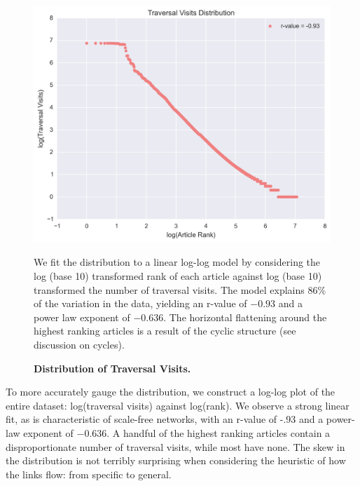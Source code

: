 \documentclass[pre,twocolumn,twoside,superscriptaddress,floatfix, aps, 10pt]{revtex4-1}
\begin{document}
\begin{figure}[tp!]
  \centering	
  \includegraphics[width=\columnwidth]{graphics/traversals_per_article.png} 
  \caption{
    \textbf{Distribution of Traversal Visits.}
  }
  We fit the distribution to a linear log-log model by considering the log (base 10) transformed rank of each article against log (base 10) transformed the number of traversal visits. 
  The model explains $86\%$ of the variation in the data, yielding an r-value of $-0.93$ 
  and a power law exponent of $-0.636$. The horizontal flattening around the highest
  ranking articles is a result of the cyclic structure (see discussion on cycles).
  \label{fig:Distribution of Visits}

\end{figure}

To more accurately gauge the distribution, we construct a log-log plot of the entire dataset: log(traversal visits) against log(rank). 
We observe a strong linear fit, as is characteristic of scale-free networks, with an r-value of -.93 and 
a power-law exponent of $-0.636$. A handful of the highest ranking articles contain a disproportionate number of traversal visits, while most have none. The skew in the distribution is not terribly surprising when considering the heuristic of how the links flow: from specific to general. 
\end{document}
